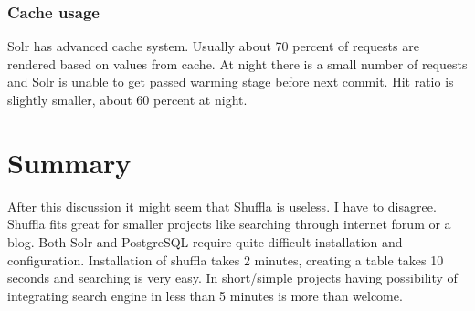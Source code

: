 \documentclass[10pt,a4paper]{article}
\begin{document}
\subsubsection*{Cache usage}
Solr has advanced cache system. Usually about 70 percent of requests are rendered based on values from cache.  At night there is a small number of requests and Solr is unable to get passed warming stage before next commit.  Hit ratio is slightly smaller, about 60 percent at night.

\section{Summary}

After this discussion it might seem that Shuffla is useless. I have to disagree. Shuffla fits great for smaller projects like searching through internet forum or a blog. Both Solr and PostgreSQL require quite difficult installation and configuration. Installation of shuffla takes 2 minutes, creating a table takes 10 seconds and searching is very easy. In short/simple projects having possibility of integrating search engine in less than 5 minutes is more than welcome.


\newpage



\end{document}
